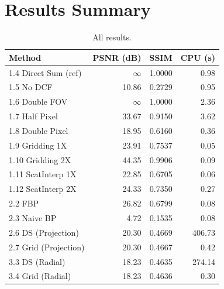 \section{Results Summary}
\begin{table}[H]\centering\caption{All results.}
\begin{tabular}{l r r r}\toprule
\textbf{Method} & \textbf{PSNR (dB)} & \textbf{SSIM} & \textbf{CPU (s)} \\\midrule
1.4 Direct Sum (ref)     & $\infty$ & 1.0000 & 0.98 \\
1.5 No DCF               & 10.86 & 0.2729 & 0.95 \\
1.6 Double FOV           & $\infty$ & 1.0000 & 2.36 \\
1.7 Half Pixel           & 33.67 & 0.9150 & 3.62 \\
1.8 Double Pixel         & 18.95 & 0.6160 & 0.36 \\
1.9 Gridding 1X          & 23.91 & 0.7537 & 0.05 \\
1.10 Gridding 2X         & 44.35 & 0.9906 & 0.09 \\
1.11 ScatInterp 1X       & 22.85 & 0.6705 & 0.06 \\
1.12 ScatInterp 2X       & 24.33 & 0.7350 & 0.27 \\\midrule
2.2 FBP                  & 26.82 & 0.6799 & 0.08 \\
2.3 Naive BP             &  4.72 & 0.1535 & 0.08 \\
2.6 DS (Projection)      & 20.30 & 0.4669 & 406.73 \\
2.7 Grid (Projection)    & 20.30 & 0.4667 & 0.42 \\\midrule
3.3 DS (Radial)          & 18.23 & 0.4635 & 274.14 \\
3.4 Grid (Radial)        & 18.23 & 0.4636 & 0.30 \\\bottomrule
\end{tabular}\end{table}

